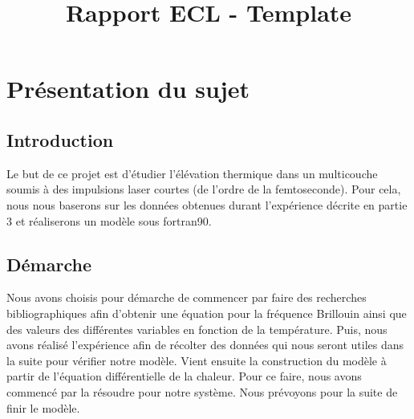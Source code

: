 \documentclass{rapportECC}
\title{Rapport ECL - Template} %
\begin{document}





        
\fairemarges %
\fairepagedegarde %
\tabledematieres %



\section{Présentation du sujet} 

\subsection{Introduction}

Le but de ce projet est d'étudier l'élévation thermique dans un multicouche soumis à des impulsions laser courtes (de l'ordre de la femtoseconde). Pour cela, nous nous baserons sur les données obtenues durant l'expérience décrite en partie 3 et réaliserons un modèle sous fortran90.

\subsection{Démarche}

Nous avons choisis pour démarche de commencer par faire des recherches bibliographiques afin d'obtenir une équation pour la fréquence Brillouin ainsi que des valeurs des différentes variables en fonction de la température. Puis, nous avons réalisé l'expérience afin de récolter des données qui nous seront utiles dans la suite pour vérifier notre modèle. Vient ensuite la construction du modèle à partir de l'équation différentielle de la chaleur. Pour ce faire, nous avons commencé par la résoudre pour notre système. Nous prévoyons pour la suite de finir le modèle.
\end{document}
